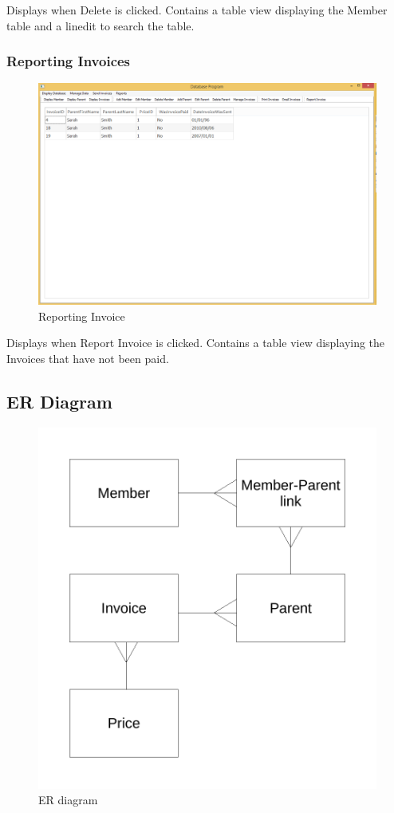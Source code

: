Displays when Delete is clicked. Contains a table view displaying the Member table and a linedit to search the table.

\subsubsection{Reporting Invoices}
\begin{figure}[H]
\includegraphics[width=\textwidth]{./Maintenance/Images/ReportInvoice.png}
    \caption{Reporting Invoice} \label{fig:report_invoice}
\end{figure}

Displays when Report Invoice is clicked. Contains a table view displaying the Invoices that have not been paid.

\subsection{ER Diagram}
\begin{figure}[H]
\includegraphics[width=\textwidth]{./Design/images/ER_diagram_design.pdf}
    \caption{ER diagram} \label{fig:ER_diagram}
\end{figure}

